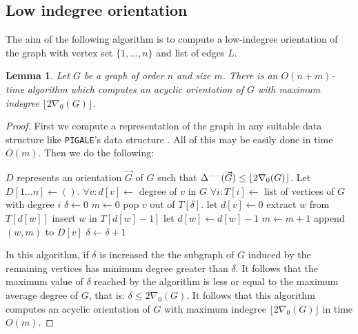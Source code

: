 \documentclass[a4paper]{amsart}
\newtheorem{lemma}[theorem]{Lemma}
\theoremstyle{definition}
\theoremstyle{remark}
\newcommand{\rdens}[1]{\nabla_{#1}}
\DeclareMathOperator\md{\Delta^{\rm --}}
\def\vG{\vec{G}}
\begin{document}
\subsection{Low indegree orientation}

The aim of the following algorithm is to compute a low-indegree
orientation of the graph with vertex set $\{1,\dots,n\}$ and list of
edges $L$.

\begin{lemma}
Let $G$ be a graph of order $n$ and size $m$. There is an
$O(n+m)$-time algorithm which computes an acyclic orientation of $G$
with maximum indegree $\lfloor 2\rdens{0}(G)\rfloor$.
\end{lemma}
\begin{proof}
First we 
compute a representation of the graph in any suitable data structure
like {\tt PIGALE}'s data structure \cite{Taxi_pigale}. All of this may
be easily done in time $O(m)$. Then we do the following:

\vspace{5mm}
\begin{algorithmic}
\ENSURE $D$ represents an orientation $\vG$ of $G$ such that
$\md(\vG)\leq\lfloor 2\rdens{0}(G)\rfloor$. 
\STATE Let $D[1\dots n]\leftarrow ()$.
\STATE $\forall v: d[v]\leftarrow$ degree of $v$ in $G$
\STATE $\forall i: T[i]\leftarrow$ list of vertices of $G$ with degree $i$
\STATE $\delta\leftarrow 0$
\STATE $m\leftarrow 0$
    \STATE pop $v$ out of $T[\delta]$.
    \STATE let $d[v]\leftarrow 0$
               \STATE extract $w$ from  $T[d[w]]$
               \STATE insert $w$ in $T[d[w]-1]$
            \ENDIF
            \STATE let $d[w]\leftarrow d[w]-1$
            \STATE $m\leftarrow m+1$
            \STATE append $(w,m)$ to $D[v]$
         \ENDIF
      \ENDFOR
  \ELSE
    \STATE $\delta\leftarrow\delta+1$
  \ENDIF
\ENDWHILE
\end{algorithmic}

In this algorithm, if $\delta$ is increased the the 
subgraph of $G$ induced by the remaining vertices
has minimum degree greater than $\delta$. It follows
that the maximum value of $\delta$ reached by the algorithm is less or
equal to the maximum average degree of $G$, that is: $\delta\leq
2\rdens{0}(G)$.
It follows that this algorithm computes an acyclic orientation of $G$
with maximum indegree $\lfloor 2\rdens{0}(G)\rfloor$ in time $O(m)$.
\end{proof}
\end{document}
